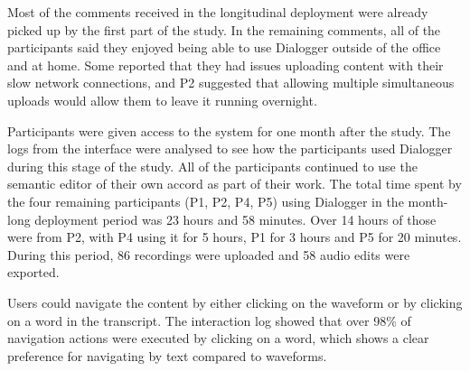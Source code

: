 Most of the comments received in the longitudinal deployment were already picked up by the first part of the study. In
the remaining comments, all of the participants said they enjoyed being able to use Dialogger outside of the office and
at home. Some reported that they had issues uploading content with their slow network connections, and P2 suggested
that allowing multiple simultaneous uploads would allow them to leave it running overnight.

Participants were given access to the system for one month after the study.  The logs from the interface were analysed
to see how the participants used Dialogger during this stage of the study.
All of the participants continued to use the semantic editor of their own accord as part of their work. The total time
spent by the four remaining participants (P1, P2, P4, P5) using Dialogger in the month-long deployment period was 23
hours and 58 minutes.  Over 14 hours of those were from P2, with P4 using it for 5 hours, P1 for 3 hours and P5 for 20
minutes.  During this period, 86 recordings were uploaded and 58 audio edits were exported.


Users could navigate the content by either clicking on the waveform or by clicking on a word in the transcript. The
interaction log showed that over 98\% of navigation actions were executed by clicking on a word, which shows a clear
preference for navigating by text compared to waveforms.

